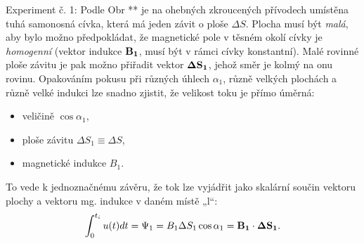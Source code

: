       Experiment č. 1:
      Podle Obr ** je na ohebných zkroucených přívodech umístěna tuhá samonosná cívka, která má
      jeden závit o ploše \(\Delta S\). Plocha musí být \emph{malá}, aby bylo možno předpokládat, že
      magnetické pole v těsném okolí cívky je \emph{homogenní} (vektor indukce \(\mathbf{B_1}\), musí
      být v rámci cívky konstantní). Malé rovinné ploše závitu je pak možno přiřadit vektor
      \(\mathbf{\Delta S_1}\), jehož směr je kolmý na onu rovinu. Opakováním pokusu při různých úhlech
      \(\alpha_1\), různě velkých plochách a různě velké indukci lze snadno zjistit, že velikost
      toku je přímo úměrná:
      \begin{itemize}
        \item veličině \(\cos\alpha_1\),
        \item ploše závitu \(\Delta S_1 \equiv \Delta S\),
        \item magnetické indukce \(B_1\).
      \end{itemize}
      To vede k jednoznačnému závěru, že tok lze vyjádřit jako skalární součin vektoru plochy a
      vektoru mg. indukce v daném místě „l“:
      \begin{equation}\label{ES:eq_zakl_elm07}
        \int_0^{t_i} u(t)dt = \Psi_1 = B_1\Delta S_1\cos\alpha_1 = \mathbf{B_1}\cdot\mathbf{\Delta S_1}.
      \end{equation}  
        
